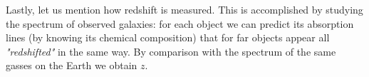 Lastly, let us mention how redshift is measured. This is accomplished by studying the spectrum of observed galaxies: for each object we can predict its absorption lines (by knowing its chemical composition) that for far objects appear all \emph{"redshifted"} in the same way. By comparison with the spectrum of the same gasses on the Earth we obtain $z$. 